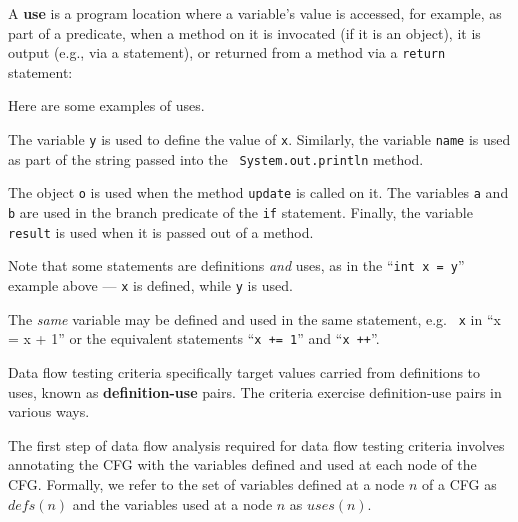 
A {\bf use} is a program location where a variable's value is accessed, for
example, as part of a predicate, when a method on it is invocated (if it is an
object), it is output (e.g., via a  statement), or
returned from a method via a {\tt return} statement:

\begin{center} 
\end{center}  


Here are some examples of uses.

The variable {\tt y} is used to define the value of {\tt x}. Similarly, the variable
{\tt name} is used as part of the string passed into the {\tt
System.out.println} method. 

The object {\tt o} is used when the method {\tt update} is called on it. The
variables {\tt a} and {\tt b} are used in the branch predicate of the {\tt if}
statement. Finally, the variable {\tt result} is used when it is passed out of
a method.


Note that some statements are definitions {\it and} uses, as in the ``{\tt int x = y}''
example above --- {\tt x} is defined, while {\tt y} is used. 

The {\it same} variable may be defined and used in the same statement, e.g. {\tt
x} in ``{x = x + 1}'' or the equivalent statements ``{\tt x += 1}'' and ``{\tt x ++}''.


Data flow testing criteria specifically target values carried from
definitions to uses, known as {\bf definition-use} pairs. The criteria exercise
definition-use pairs in various ways.


The first step of data flow analysis required for data flow testing criteria
involves annotating the CFG with the variables defined and used at each node of
the CFG. Formally, we refer to the set of variables defined at a node $n$ of a
CFG as $\mathit{defs}(n)$ and the variables used at a node $n$ as $\mathit{uses}(n)$.

